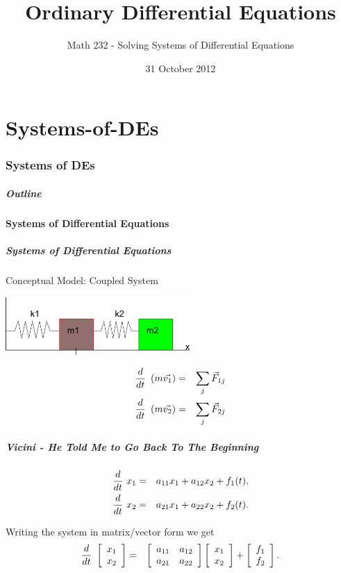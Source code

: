 \part{Systems-of-DEs}
\section{Systems of DEs}


\title{Ordinary Differential Equations}
\subtitle{Math 232 - Solving Systems of Differential Equations}
\date{31 October 2012}

\begin{frame}
  \titlepage
\end{frame}

\begin{frame}
  \frametitle{Outline}
  \tableofcontents[ currentsection ]
\end{frame}


\subsection{Systems of Differential Equations}


\begin{frame}
  \frametitle{Systems of Differential Equations}

  Conceptual Model: Coupled System \\
  \centerline{\includegraphics[width=7cm]{img/doubleSpringMass}}

  \begin{eqnarray*}
    \deriv{~}{t} \lp m \vec{v_1} \rp & = & \sum_j \vec{F}_{1j} \\
    \deriv{~}{t} \lp m \vec{v_2} \rp & = & \sum_j \vec{F}_{2j} 
  \end{eqnarray*}


\end{frame}


\begin{frame}
  \frametitle{Vicini - He Told Me to Go Back To The Beginning}

  \begin{eqnarray*}
    \deriv{~}{t} x_1  & = & a_{11} x_1 + a_{12} x_2 + f_1(t), \\
    \deriv{~}{t} x_2  & = & a_{21} x_1 + a_{22} x_2 + f_2(t).
  \end{eqnarray*}

  Writing the system in matrix/vector form we get
  \begin{eqnarray*}
    \deriv{~}{t} \vecTwo{x_1}{x_2} & = & 
    \arrayTwo{a_{11}}{a_{12}}{a_{21}}{a_{22}} \vecTwo{x_1}{x_2} + 
    \vecTwo{f_1}{f_2}.
  \end{eqnarray*}

\end{frame}


